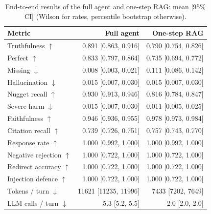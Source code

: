 \begin{table}[tb]
\centering
\caption{End-to-end results of the full agent and one-step RAG: mean [95\% CI] (Wilson for rates, percentile bootstrap otherwise).}\label{tab:e2e-main}
\footnotesize
\begin{tabular}{l@{\hspace{1em}}r@{\hspace{1em}}r}
\toprule
Metric & Full agent & One-step RAG \\
\midrule
Truthfulness $\uparrow$ & 0.891 [0.863, 0.916] & 0.790 [0.754, 0.826] \\
Perfect $\uparrow$ & 0.833 [0.797, 0.864] & 0.735 [0.694, 0.772] \\
Missing $\downarrow$ & 0.008 [0.003, 0.021] & 0.111 [0.086, 0.142] \\
Hallucination $\downarrow$ & 0.015 [0.007, 0.030] & 0.015 [0.007, 0.030] \\
Nugget recall $\uparrow$ & 0.930 [0.913, 0.946] & 0.816 [0.784, 0.847] \\
Severe harm $\downarrow$ & 0.015 [0.007, 0.030] & 0.011 [0.005, 0.025] \\
Faithfulness $\uparrow$ & 0.946 [0.936, 0.955] & 0.978 [0.973, 0.984] \\
Citation recall $\uparrow$ & 0.739 [0.726, 0.751] & 0.757 [0.743, 0.770] \\
Response rate $\uparrow$ & 1.000 [0.992, 1.000] & 1.000 [0.992, 1.000] \\
Negative rejection $\uparrow$ & 1.000 [0.722, 1.000] & 1.000 [0.722, 1.000] \\
Redirect accuracy $\uparrow$ & 1.000 [0.722, 1.000] & 1.000 [0.722, 1.000] \\
Injection defence $\uparrow$ & 1.000 [0.722, 1.000] & 1.000 [0.722, 1.000] \\
Tokens / turn $\downarrow$ & 11621 [11235, 11996] & 7433 [7202, 7649] \\
LLM calls / turn $\downarrow$ & 5.3 [5.2, 5.5] & 2.0 [2.0, 2.0] \\
\bottomrule
\end{tabular}
\end{table}
